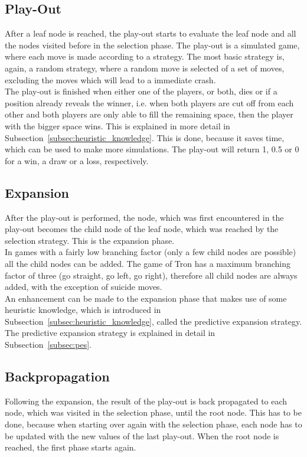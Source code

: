 \documentclass{article}
\begin{document}
\subsection{Play-Out}
\label{subsec:play_out}
After a leaf node is reached, the play-out starts to evaluate the leaf node and all the nodes visited before in the selection phase. The play-out is a simulated game, where each move is made according to a strategy. The most basic strategy is, again, a random strategy, where a random move is selected of a set of moves, excluding the moves which will lead to a immediate crash.\\
The play-out is finished when either one of the players, or both, dies or if a position already reveals the winner, i.e. when both players are cut off from each other and both players are only able to fill the remaining space, then the player with the bigger space wins. This is explained in more detail in Subsection~\ref{subsec:heuristic_knowledge}. This is done, because it saves time, which can be used to make more simulations. The play-out will return 1, 0.5 or 0 for a win, a draw or a loss, respectively.

\subsection{Expansion}
\label{subsec:expansion}
After the play-out is performed, the node, which was first encountered in the play-out becomes the child node of the leaf node, which was reached by the selection strategy. This is the expansion phase.\\
In games with a fairly low branching factor (only a few child nodes are possible) all the child nodes can be added. The game of Tron has a maximum branching factor of three (go straight, go left, go right), therefore all child nodes are always added, with the exception of suicide moves.\\
An enhancement can be made to the expansion phase that makes use of some heuristic knowledge, which is introduced in Subsection~\ref{subsec:heuristic_knowledge}, called the predictive expansion strategy. The predictive expansion strategy is explained in detail in Subsection~\ref{subsec:pes}.

\subsection{Backpropagation}
\label{subsec:backpropagation}
Following the expansion, the result of the play-out is back propagated to each node, which was visited in the selection phase, until the root node. This has to be done, because when starting over again with the selection phase, each node has to be updated with the new values of the last play-out. When the root node is reached, the first phase starts again.
\end{document}

